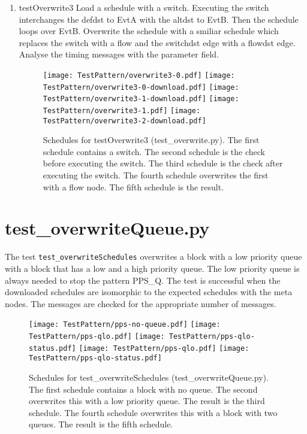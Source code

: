 \documentclass[12pt,a4paper]{report}
\begin{document}
\begin{enumerate}
\item testOverwrite3
    Load a schedule with a switch. Executing the switch interchanges
    the defdst to EvtA with the altdst to EvtB. Then the schedule loops
    over EvtB.
    Overwrite the schedule with a smiliar schedule which replaces the switch
    with a flow and the switchdst edge with a flowdst edge.
    Analyse the timing messages with the parameter field.
    \begin{figure}
        \centering
        \texttt{[image: TestPattern/overwrite3-0.pdf]}
        \texttt{[image: TestPattern/overwrite3-0-download.pdf]}
        \texttt{[image: TestPattern/overwrite3-1-download.pdf]}
        \texttt{[image: TestPattern/overwrite3-1.pdf]}
        \texttt{[image: TestPattern/overwrite3-2-download.pdf]}
        \caption{Schedules for testOverwrite3 (test\_overwrite.py). The first schedule
        contains a switch. The second schedule is the check before executing the
        switch. The third schedule is the check after executing the
        switch. The fourth schedule overwrites the first
        with a flow node. The fifth schedule is the result.}
        \label{fig:Schedules_for_testOverwrite3}
    \end{figure}

\end{enumerate}

\section{test\_overwriteQueue.py}
The test \texttt{test\_overwriteSchedules} overwrites a block with a low priority
queue with a block that has a low and a high priority queue. The low priority
queue is always needed to stop the pattern PPS\_Q. The test is successful when
the downloaded schedules are isomorphic to the expected schedules with the
meta nodes. The messages are checked for the appropriate number of messages.
    \begin{figure}
        \centering
        \texttt{[image: TestPattern/pps-no-queue.pdf]}
        \texttt{[image: TestPattern/pps-qlo.pdf]}
        \texttt{[image: TestPattern/pps-qlo-status.pdf]}
        \texttt{[image: TestPattern/pps-qlo.pdf]}
        \texttt{[image: TestPattern/pps-qlo-status.pdf]}
        \caption{Schedules for test\_overwriteSchedules (test\_overwriteQueue.py). The first schedule
        contains a block with no queue. The second overwrites this with a low priority queue.
        The result is the third schedule. The fourth schedule overwrites this with a block with
        two queues. The result is the fifth schedule.}
        \label{fig:Schedules_for_test_overwriteSchedules}
    \end{figure}
\end{document}
